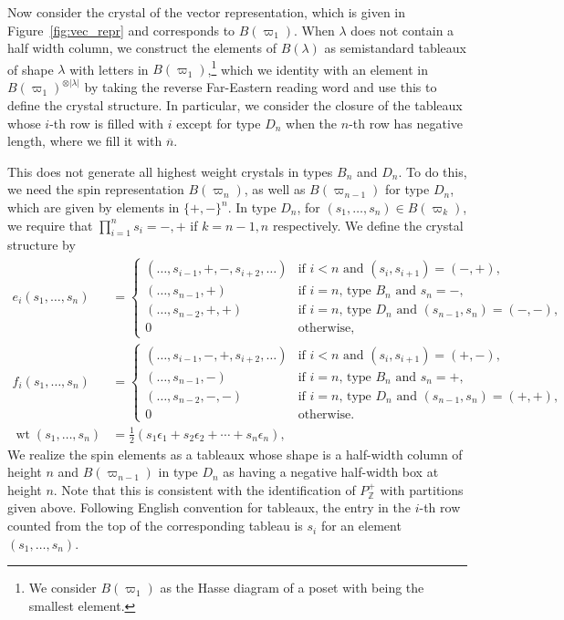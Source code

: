 \documentclass[11pt, leqno]{amsart}
\theoremstyle{plain}
\theoremstyle{definition}
\numberwithin{equation}{section}
\newcommand{\fw}{\varpi} %
\newcommand{\Z}{\mathbb{Z}}
\newcommand{\wt}{\operatorname{wt}} %
\newcommand{\on}{\overline{n}}
\begin{document}
Now consider the crystal of the vector representation, which is given in Figure~\ref{fig:vec_repr} and corresponds to $B(\fw_1)$. When $\lambda$ does not contain a half width column, we construct the elements of $B(\lambda)$ as semistandard tableaux of shape $\lambda$ with letters in $B(\fw_1)$,\footnote{We consider $B(\fw_1)$ as the Hasse diagram of a poset with  being the smallest element.} which we identity with an element in $B(\fw_1)^{\otimes |\lambda|}$ by taking the reverse Far-Eastern reading word and use this to define the crystal structure. In particular, we consider the closure of the tableaux whose $i$-th row is filled with $i$ except for type $D_n$ when the $n$-th row has negative length, where we fill it with $\on$.

This does not generate all highest weight crystals in types $B_n$ and $D_n$. To do this, we need the spin representation $B(\fw_n)$, as well as $B(\fw_{n-1})$ for type $D_n$, which are given by elements in $\{+, -\}^n$. In type $D_n$, for $(s_1, \dotsc, s_n) \in B(\fw_k)$, we require that $\prod_{i=1}^n s_i = -,+$ if $k = n-1,n$ respectively. We define the crystal structure by
\begin{align*}
e_i(s_1, \dotsc, s_n) & = \begin{cases}
(\dotsc, s_{i-1}, +, -, s_{i+2}, \dotsc) & \text{if $i < n$ and } (s_i, s_{i+1}) = (-, +), \\
(\dotsc, s_{n-1}, +) & \text{if $i = n$, type $B_n$ and } s_n = -, \\
(\dotsc, s_{n-2}, +, +) & \text{if $i = n$, type $D_n$ and } (s_{n-1}, s_n) = (-, -), \\
0 & \text{otherwise},
\end{cases}
\\ f_i(s_1, \dotsc, s_n) & = \begin{cases}
(\dotsc, s_{i-1}, -, +, s_{i+2}, \dotsc) & \text{if $i < n$ and } (s_i, s_{i+1}) = (+, -), \\
(\dotsc, s_{n-1}, -) & \text{if $i = n$, type $B_n$ and } s_n = +, \\
(\dotsc, s_{n-2}, -, -) & \text{if $i = n$, type $D_n$ and } (s_{n-1}, s_n) = (+, +), \\
0 & \text{otherwise}.
\end{cases}
\\ \wt(s_1, \dotsc, s_n) & = \frac{1}{2} \left( s_1 \epsilon_1 + s_2 \epsilon_2 + \cdots + s_n \epsilon_n \right),
\end{align*}
We realize the spin elements as a tableaux whose shape is a half-width column of height $n$ and $B(\fw_{n-1})$ in type $D_n$ as having a negative half-width box at height $n$. Note that this is consistent with the identification of $P_{\Z}^+$ with partitions given above. Following English convention for tableaux, the entry in the $i$-th row counted from the top of the corresponding tableau is $s_i$ for an element $(s_1, \dotsc, s_n)$.
\end{document}
